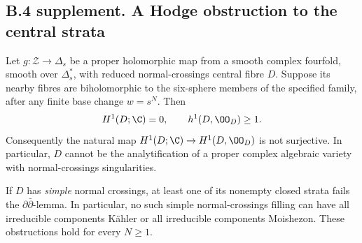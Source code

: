 \subsection{B.4 supplement. A Hodge obstruction to the central strata}

\begin{theorem}
Let $g:\mathcal Z\to\Delta_s$ be a proper holomorphic map from a
smooth complex fourfold, smooth over $\Delta_s^*$, with reduced
normal-crossings central fibre $D$. Suppose its nearby fibres are
biholomorphic to the six-sphere members of the specified family,
after any finite base change $w=s^N$. Then
\[
 H^1(D;\C)=0,\qquad h^1(D,\OO_D)\geq1.
\]
Consequently the natural map
$H^1(D;\C)\to H^1(D,\OO_D)$ is not surjective. In particular,
$D$ cannot be the analytification of a proper complex algebraic
variety with normal-crossings singularities.

If $D$ has \emph{simple} normal crossings, at least one of its
nonempty closed strata fails the $\partial\bar\partial$-lemma.
In particular, no such simple normal-crossings filling can have
all irreducible components K\"ahler or all irreducible components
Moishezon. These obstructions hold for every $N\geq1$.
\end{theorem}
